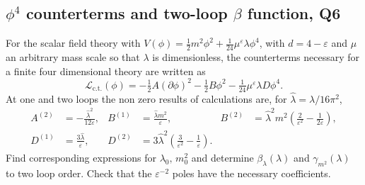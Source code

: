 \subsection{$\phi^4$ counterterms and two-loop $\beta$ function, Q6}
For the scalar field theory with $V(\phi) = \tfrac{1}{2}m^2\phi^2 + \tfrac{1}{24}\mu^\varepsilon\lambda\phi^4$, with $d = 4-\varepsilon$ and $\mu$ an arbitrary mass scale so that $\lambda$ is dimensionless, the counterterms necessary for a finite four dimensional theory are written as
\begin{equation}
    \mathcal{L}_{\text{c.t.}}(\phi) = -\tfrac{1}{2}A(\partial\phi)^2 - \tfrac{1}{2}B\phi^2 - \tfrac{1}{24}\mu^\varepsilon\lambda D\phi^4.
\end{equation}
At one and two loops the non zero results of calculations are, for $\hat\lambda = \lambda/16\pi^2$,
\begin{align}
    A^{(2)} &= -\frac{\hat\lambda^2}{12\varepsilon}, & 
    B^{(1)} &= \frac{\hat\lambda m^2}{\varepsilon}, & 
    B^{(2)} &= \hat\lambda^2 m^2\!\left(\frac{2}{\varepsilon^2} - \frac{1}{2\varepsilon}\right), \\
    D^{(1)} &= \frac{3\hat\lambda}{\varepsilon}, & 
    D^{(2)} &= 3\hat\lambda^2\!\left(\frac{3}{\varepsilon^2} - \frac{1}{\varepsilon}\right).
\end{align}
Find corresponding expressions for $\lambda_0,\,m_0^2$ and determine $\beta_\lambda(\lambda)$ and $\gamma_{m^2}(\lambda)$ to two loop order. Check that the $\varepsilon^{-2}$ poles have the necessary coefficients.
